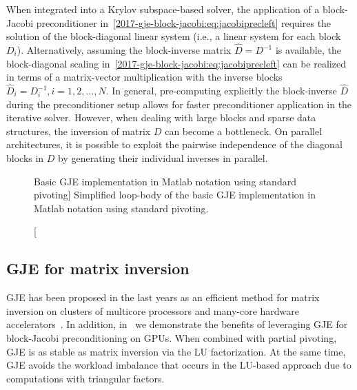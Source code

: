 When integrated into a Krylov subspace-based solver, 
the application of a block-Jacobi preconditioner in~\eqref{2017-gje-block-jacobi:eq:jacobiprecleft}
requires the solution of the block-diagonal linear system (i.e., a linear system
for each block $D_i$).
Alternatively, 
assuming the block-inverse matrix $\hat{D}=D^{-1}$
is available, the block-diagonal scaling in~\eqref{2017-gje-block-jacobi:eq:jacobiprecleft}
can be realized in terms of a matrix-vector multiplication with the inverse blocks
$\hat{D}_i=D_i^{-1}, i=1,2,\dots,N$.
In general, pre-computing explicitly the block-inverse $\hat{D}$ during the preconditioner setup 
allows for faster preconditioner application in the iterative solver.
However, when dealing with large blocks and 
sparse data structures, 
the inversion of matrix $D$ can become a bottleneck. 
On parallel architectures, it is possible to exploit the pairwise independence of the diagonal blocks in $D$
by generating their individual inverses in parallel.

\begin{figure}[t]
\begin{center}
\begin{minipage}{\columnwidth}
{\small

}
\end{minipage}
\caption
[Basic GJE implementation in Matlab notation using standard pivoting]
{Simplified loop-body of the basic GJE implementation in Matlab
    notation using standard pivoting.}
\label{2017-gje-block-jacobi:fig:gje}
\end{center}
\end{figure}
\subsection{GJE for matrix inversion}\label{2017-gje-block-jacobi:sec:gauss-jordan}

GJE has been proposed in the last years
as an efficient method for matrix inversion on 
clusters of multicore processors and many-core hardware accelerators~\cite{doi:10.1137/S1064827598345679,CPE:CPE2933}.
In addition, in~\cite{Anzt:2017:BGE:3026937.3026940} we demonstrate the benefits of {leveraging} GJE 
for block-Jacobi preconditioning on GPUs.
When combined with partial pivoting, GJE is as stable as matrix inversion via the LU factorization. 
At the same time, GJE avoids the workload imbalance that occurs in the LU-based approach 
{due to computations with}
triangular factors.

